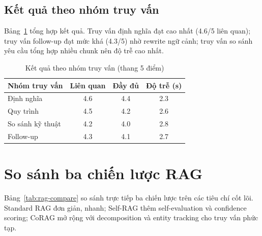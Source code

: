 \documentclass[10pt, conference, a4paper, compsocconf]{IEEEtran}
\begin{document}
\subsection{Kết quả theo nhóm truy vấn}

Bảng~\ref{tab:exp-result} tổng hợp kết quả. Truy vấn định nghĩa đạt cao nhất (4.6/5 liên quan); truy vấn follow-up đạt mức khá (4.3/5) nhờ rewrite ngữ cảnh; truy vấn so sánh yêu cầu tổng hợp nhiều chunk nên độ trễ cao nhất.

\begin{table}[t]
\renewcommand{\arraystretch}{1.15}
\caption{Kết quả theo nhóm truy vấn (thang 5 điểm)}
\label{tab:exp-result}
\centering
\begin{tabular}{|l|c|c|c|}
\hline
Nhóm truy vấn & Liên quan & Đầy đủ & Độ trễ (s) \\
\hline
Định nghĩa & 4.6 & 4.4 & 2.3 \\
\hline
Quy trình & 4.5 & 4.2 & 2.6 \\
\hline
So sánh kỹ thuật & 4.2 & 4.0 & 2.8 \\
\hline
Follow-up & 4.3 & 4.1 & 2.7 \\
\hline
\end{tabular}
\end{table}

\section{So sánh ba chiến lược RAG}

Bảng~\ref{tab:rag-compare} so sánh trực tiếp ba chiến lược trên các tiêu chí cốt lõi. Standard RAG đơn giản, nhanh; Self-RAG thêm self-evaluation và confidence scoring; CoRAG mở rộng với decomposition và entity tracking cho truy vấn phức tạp.
\end{document}
